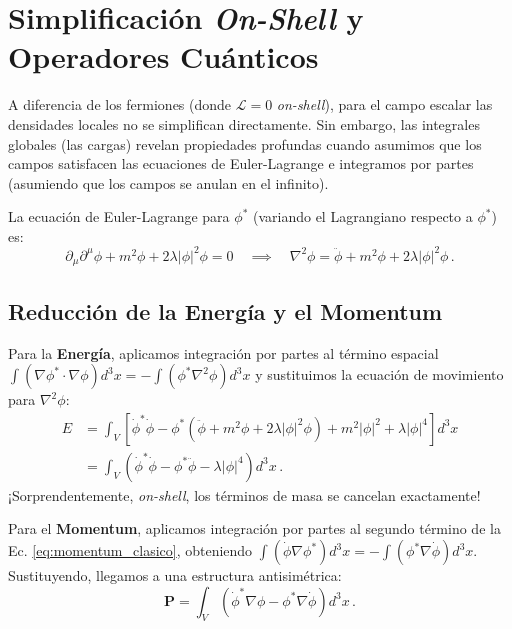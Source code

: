 \section{Simplificación \textit{On-Shell} y Operadores Cuánticos}

A diferencia de los fermiones (donde $\mathcal{L} = 0$ \textit{on-shell}), para el campo escalar las densidades locales no se simplifican directamente. Sin embargo, las integrales globales (las cargas) revelan propiedades profundas cuando asumimos que los campos satisfacen las ecuaciones de Euler-Lagrange e integramos por partes (asumiendo que los campos se anulan en el infinito).

La ecuación de Euler-Lagrange para $\phi^*$ (variando el Lagrangiano respecto a $\phi^*$) es:
\begin{equation}
    \partial_\mu \partial^\mu \phi + m^2\phi + 2\lambda|\phi|^2\phi = 0 \quad \implies \quad \nabla^2\phi = \ddot{\phi} + m^2\phi + 2\lambda|\phi|^2\phi \, .
\end{equation}

\subsection{Reducción de la Energía y el Momentum}

Para la \textbf{Energía}, aplicamos integración por partes al término espacial $\int (\nabla\phi^* \cdot \nabla\phi) d^3x = -\int (\phi^* \nabla^2\phi) d^3x$ y sustituimos la ecuación de movimiento para $\nabla^2\phi$:
\begin{align}
    E &= \int_V \left[ \dot{\phi}^*\dot{\phi} - \phi^*\left( \ddot{\phi} + m^2\phi + 2\lambda|\phi|^2\phi \right) + m^2|\phi|^2 + \lambda|\phi|^4 \right] d^3x \nonumber \\
    &= \int_V \left( \dot{\phi}^*\dot{\phi} - \phi^*\ddot{\phi} - \lambda|\phi|^4 \right) d^3x \, .
\end{align}
¡Sorprendentemente, \textit{on-shell}, los términos de masa se cancelan exactamente!

Para el \textbf{Momentum}, aplicamos integración por partes al segundo término de la Ec. \eqref{eq:momentum_clasico}, obteniendo $\int (\dot{\phi} \nabla \phi^*) d^3x = - \int (\phi^* \nabla \dot{\phi}) d^3x$. Sustituyendo, llegamos a una estructura antisimétrica:
\begin{equation}
    \mathbf{P} = \int_V \left( \dot{\phi}^* \nabla \phi - \phi^* \nabla \dot{\phi} \right) d^3x \, .
    \label{eq:momentum_antisimetrico}
\end{equation}

